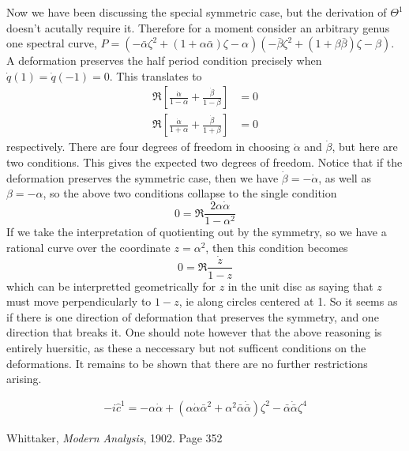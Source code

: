 \documentclass{article}
\begin{document}
Now we have been discussing the special symmetric case, but the derivation of $Θ^1$ doesn't acutally require it. Therefore for a moment consider an arbitrary genus one spectral curve, $P = (-\bar{α}    ζ  ^2 + (1 +  α  \bar{α}  ) ζ   -  α  )(-\bar{β}  ζ  ^2 + (1 + β\bar{β}) ζ   - β)$. A deformation preserves the half period condition precisely when $\dot q(1)=\dot q(-1) = 0$. This translates to
\begin{align*}
\Re\left[ \frac{\dot{α}  }{1- α  } + \frac{\dot{β}}{1-β} \right] &= 0 \\
\Re\left[ \frac{\dot{α}  }{1+ α  } + \frac{\dot{β}}{1+β} \right] &= 0
\end{align*}
respectively. There are four degrees of freedom in choosing $\dot{α}  $ and $\dot{β}$, but here are two conditions. This gives the expected two degrees of freedom. Notice that if the deformation preserves the symmetric case, then we have $\dot{β} = - \dot{α}  $, as well as $β=- α  $, so the above two conditions collapse to the single condition
\[
0 = \Re \frac{2 α  \dot{α}  }{1- α  ^2}
\]
If we take the interpretation of quotienting out by the symmetry, so we have a rational curve over the coordinate $z= α  ^2$, then this condition becomes
\[
0 = \Re \frac{\dot z}{1-z}
\]
which can be interpretted geometrically for $z$ in the unit disc as saying that $z$ must move perpendicularly to $1-z$, ie along circles centered at 1. So it seems as if there is one direction of deformation that preserves the symmetry, and one direction that breaks it. One should note however that the above reasoning is entirely huersitic, as these a neccessary but not sufficent conditions on the deformations. It remains to be shown that there are no further restrictions arising.

\begin{align*}
-i \hat c^1 = - α  \dot{α}   + ( α  \dot{α}  \bar{α}  ^2 +  α  ^2\bar{α}  \dot{\bar{α}  }) ζ  ^2 - \bar{α}  \dot{\bar{α}  } ζ  ^4
\end{align*}

\begin{thebibliography}{9}

  Whittaker,
  \emph{Modern Analysis}, 1902. Page 352

\end{thebibliography}
\end{document}

